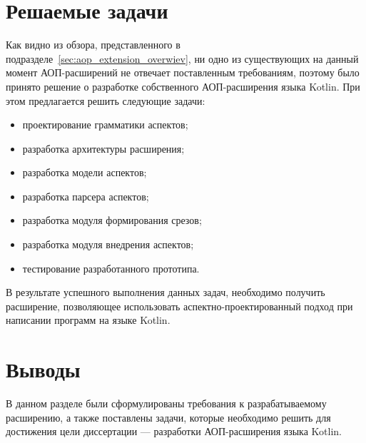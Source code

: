 \section{Решаемые задачи}
\label{sec:tasks}
Как видно из обзора, представленного в подразделе~\ref{sec:aop_extension_overwiev}, ни одно из существующих на данный момент АОП-расширений не отвечает поставленным требованиям, поэтому было принято решение о разработке собственного АОП-расширения языка Kotlin.
При этом предлагается решить следующие задачи:
\begin{itemize}
    \item проектирование грамматики аспектов;
    \item разработка архитектуры расширения;
    \item разработка модели аспектов;
    \item разработка парсера аспектов;
    \item разработка модуля формирования срезов;
    \item разработка модуля внедрения аспектов;
    \item тестирование разработанного прототипа.
\end{itemize}

В результате успешного выполнения данных задач, необходимо получить расширение, позволяющее использовать аспектно-проектированный подход при написании программ на языке Kotlin.
\section{Выводы}
В данном разделе были сформулированы требования к разрабатываемому расширению, а также поставлены задачи, которые необходимо решить для достижения цели диссертации --- разработки АОП-расширения языка Kotlin.